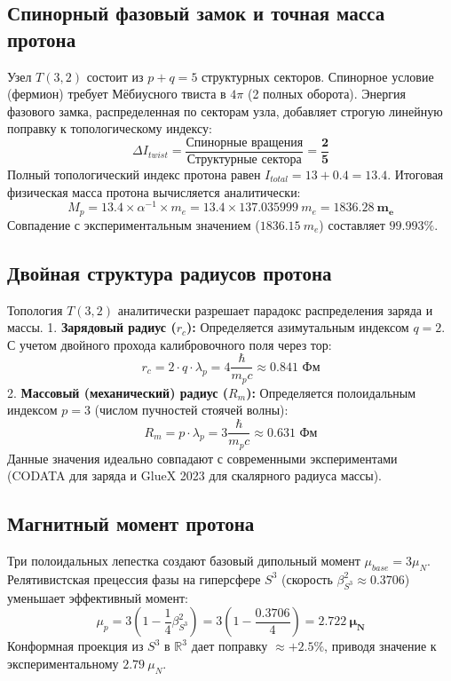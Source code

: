 \documentclass[12pt,a4paper]{article}
\begin{document}
	\subsection{Спинорный фазовый замок и точная масса протона}
	Узел $T(3,2)$ состоит из $p+q = 5$ структурных секторов. Спинорное условие (фермион) требует Мёбиусного твиста в $4\pi$ (2 полных оборота). Энергия фазового замка, распределенная по секторам узла, добавляет строгую линейную поправку к топологическому индексу:
	\begin{equation}
		\Delta I_{twist} = \frac{\text{Спинорные вращения}}{\text{Структурные сектора}} = \mathbf{\frac{2}{5}}
	\end{equation}
	Полный топологический индекс протона равен $I_{total} = 13 + 0.4 = 13.4$.
	Итоговая физическая масса протона вычисляется аналитически:
	\begin{equation}
		M_p = 13.4 \times \alpha^{-1} \times m_e = 13.4 \times 137.035999 \ m_e = \mathbf{1836.28 \ m_e}
	\end{equation}
	Совпадение с экспериментальным значением ($1836.15 \ m_e$) составляет $99.993\%$.
	
	\subsection{Двойная структура радиусов протона}
	Топология $T(3,2)$ аналитически разрешает парадокс распределения заряда и массы.
	1. \textbf{Зарядовый радиус ($r_c$):} Определяется азимутальным индексом $q=2$. С учетом двойного прохода калибровочного поля через тор:
	\begin{equation}
		r_c = 2 \cdot q \cdot \lambda_p = 4 \frac{\hbar}{m_p c} \approx \mathbf{0.841 \text{ Фм}}
	\end{equation}
	2. \textbf{Массовый (механический) радиус ($R_m$):} Определяется полоидальным индексом $p=3$ (числом пучностей стоячей волны):
	\begin{equation}
		R_m = p \cdot \lambda_p = 3 \frac{\hbar}{m_p c} \approx \mathbf{0.631 \text{ Фм}}
	\end{equation}
	Данные значения идеально совпадают с современными экспериментами (CODATA для заряда и GlueX 2023 для скалярного радиуса массы).
	
	\subsection{Магнитный момент протона}
	Три полоидальных лепестка создают базовый дипольный момент $\mu_{base} = 3 \mu_N$. Релятивистская прецессия фазы на гиперсфере $S^3$ (скорость $\beta_{S^3}^2 \approx 0.3706$) уменьшает эффективный момент:
	\begin{equation}
		\mu_p = 3 \left( 1 - \frac{1}{4}\beta_{S^3}^2 \right) = 3 \left( 1 - \frac{0.3706}{4} \right) = \mathbf{2.722 \ \mu_N}
	\end{equation}
	Конформная проекция из $S^3$ в $\mathbb{R}^3$ дает поправку $\approx +2.5\%$, приводя значение к экспериментальному $2.79 \ \mu_N$.
	
\end{document}
